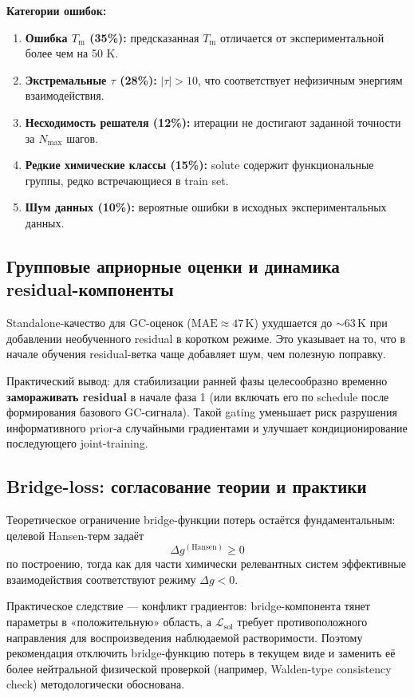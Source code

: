 \documentclass[11pt]{article}
\begin{document}
\textbf{Категории ошибок:}
\begin{enumerate}
    \item \textbf{Ошибка $T_{\mathrm{m}}$ (35\%):} предсказанная $T_{\mathrm{m}}$ отличается от экспериментальной более чем на 50 K.
    \item \textbf{Экстремальные $\tau$ (28\%):} $|\tau| > 10$, что соответствует нефизичным энергиям взаимодействия.
    \item \textbf{Несходимость решателя (12\%):} итерации не достигают заданной точности за $N_{\max}$ шагов.
    \item \textbf{Редкие химические классы (15\%):} solute содержит функциональные группы, редко встречающиеся в train set.
    \item \textbf{Шум данных (10\%):} вероятные ошибки в исходных экспериментальных данных.
\end{enumerate}

\subsection{Групповые априорные оценки и динамика residual-компоненты}

Standalone-качество для GC-оценок ($\mathrm{MAE}\approx47\,\mathrm{K}$) ухудшается до $\sim63\,\mathrm{K}$ при добавлении необученного residual в коротком режиме. Это указывает на то, что в начале обучения residual-ветка чаще добавляет шум, чем полезную поправку.

Практический вывод: для стабилизации ранней фазы целесообразно временно \textbf{замораживать residual} в начале фаза 1 (или включать его по schedule после формирования базового GC-сигнала). Такой gating уменьшает риск разрушения информативного prior-а случайными градиентами и улучшает кондиционирование последующего joint-training.

\subsection{Bridge-loss: согласование теории и практики}

Теоретическое ограничение bridge-функции потерь остаётся фундаментальным: целевой Hansen-терм задаёт
\begin{equation*}
\Delta g^{\mathrm{(Hansen)}} \ge 0
\end{equation*}
по построению, тогда как для части химически релевантных систем эффективные взаимодействия соответствуют режиму $\Delta g<0$.

Практическое следствие --- конфликт градиентов: bridge-компонента тянет параметры в «положительную» область, а $\mathcal{L}_{\mathrm{sol}}$ требует противоположного направления для воспроизведения наблюдаемой растворимости. Поэтому рекомендация отключить bridge-функцию потерь в текущем виде и заменить её более нейтральной физической проверкой (например, Walden-type consistency check) методологически обоснована.
\end{document}

